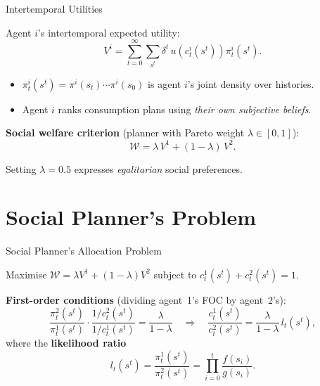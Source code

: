 \documentclass[aspectratio=169,12pt]{beamer}
\begin{document}
\begin{frame}{Intertemporal Utilities}

Agent $i$'s intertemporal expected utility:
\begin{equation}\label{eq:Vi}
  V^i = \sum_{t=0}^{\infty}\sum_{s^t} \delta^t\,u\!\left(c_t^i(s^t)\right)\pi_t^i(s^t).
\end{equation}

\begin{itemize}
  \item $\pi_t^i(s^t) = \pi^i(s_t)\cdots\pi^i(s_0)$ is agent $i$'s joint density over histories.
  \item Agent $i$ ranks consumption plans using \emph{their own subjective beliefs}.
\end{itemize}

\bigskip
\textbf{Social welfare criterion} (planner with Pareto weight $\lambda\in[0,1]$):
\[
  \mathcal{W} = \lambda\,V^1 + (1-\lambda)\,V^2.
\]

Setting $\lambda=0.5$ expresses \emph{egalitarian} social preferences.

\end{frame}

\section{Social Planner's Problem}

\begin{frame}{Social Planner's Allocation Problem}

Maximise $\mathcal{W}=\lambda V^1+(1-\lambda)V^2$ subject to
$c_t^1(s^t)+c_t^2(s^t)=1$.

\bigskip
\textbf{First-order conditions} (dividing agent~1's FOC by agent~2's):
\[
  \frac{\pi_t^2(s^t)}{\pi_t^1(s^t)}\cdot
  \frac{1/c_t^2(s^t)}{1/c_t^1(s^t)}
  = \frac{\lambda}{1-\lambda}
  \quad\Longrightarrow\quad
  \frac{c_t^1(s^t)}{c_t^2(s^t)} = \frac{\lambda}{1-\lambda}\,l_t(s^t),
\]
where the \textbf{likelihood ratio}
\[
  l_t(s^t) = \frac{\pi_t^1(s^t)}{\pi_t^2(s^t)}
             = \prod_{i=0}^{t}\frac{f(s_i)}{g(s_i)}.
\]

\end{frame}
\end{document}
